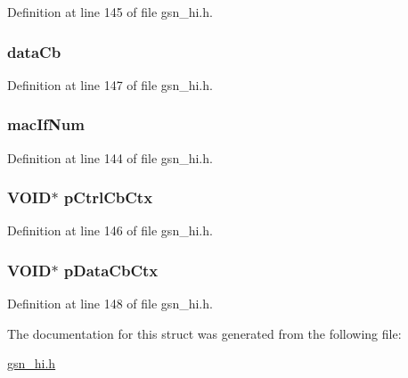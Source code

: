 Definition at line 145 of file gsn\_\-hi.h.

\hypertarget{a00087_ab5e0c9ef2bdc4d0e354528b1080f21bc}{
\subsubsection[{dataCb}]{ {\bf dataCb}}}
\label{a00087_ab5e0c9ef2bdc4d0e354528b1080f21bc}


Definition at line 147 of file gsn\_\-hi.h.

\hypertarget{a00087_aacea9b36a9084b16b483db4716bf7ea1}{
\subsubsection[{macIfNum}]{ {\bf macIfNum}}}
\label{a00087_aacea9b36a9084b16b483db4716bf7ea1}


Definition at line 144 of file gsn\_\-hi.h.

\hypertarget{a00087_ad5ece2cca5793c5c804c56153c57be66}{
\subsubsection[{pCtrlCbCtx}]{\setlength{\rightskip}{0pt plus 5cm}VOID$\ast$ {\bf pCtrlCbCtx}}}
\label{a00087_ad5ece2cca5793c5c804c56153c57be66}


Definition at line 146 of file gsn\_\-hi.h.

\hypertarget{a00087_aaac1b748e9426eb856106f9227f7634d}{
\subsubsection[{pDataCbCtx}]{\setlength{\rightskip}{0pt plus 5cm}VOID$\ast$ {\bf pDataCbCtx}}}
\label{a00087_aaac1b748e9426eb856106f9227f7634d}


Definition at line 148 of file gsn\_\-hi.h.



The documentation for this struct was generated from the following file:\begin{DoxyCompactItemize}
\item 
\hyperlink{a00504}{gsn\_\-hi.h}\end{DoxyCompactItemize}

